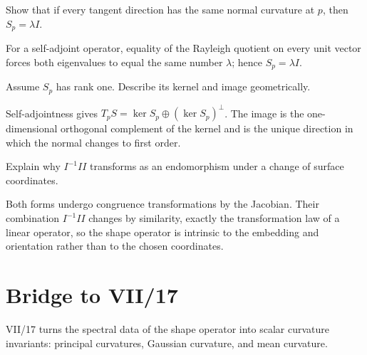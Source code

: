\begin{problem}\label{prob:vii16-ch03}
Show that if every tangent direction has the same normal curvature at \(p\), then \(S_p=\lambda I\).
\end{problem}
\begin{solution}
For a self-adjoint operator, equality of the Rayleigh quotient on every unit vector forces both eigenvalues to equal the same number \(\lambda\); hence \(S_p=\lambda I\).
\end{solution}

\begin{problem}\label{prob:vii16-ch04}
Assume \(S_p\) has rank one. Describe its kernel and image geometrically.
\end{problem}
\begin{solution}
Self-adjointness gives \(T_pS=\ker S_p\oplus(\ker S_p)^\perp\). The image is the one-dimensional orthogonal complement of the kernel and is the unique direction in which the normal changes to first order.
\end{solution}

\begin{problem}\label{prob:vii16-ch05}
Explain why \(I^{-1}II\) transforms as an endomorphism under a change of surface coordinates.
\end{problem}
\begin{solution}
Both forms undergo congruence transformations by the Jacobian. Their combination \(I^{-1}II\) changes by similarity, exactly the transformation law of a linear operator, so the shape operator is intrinsic to the embedding and orientation rather than to the chosen coordinates.
\end{solution}

\section*{Bridge to VII/17}
VII/17 turns the spectral data of the shape operator into scalar curvature invariants: principal curvatures, Gaussian curvature, and mean curvature.
